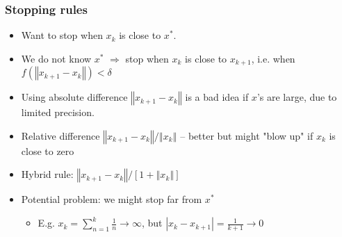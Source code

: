 \documentclass[bigger]{beamer}
\begin{document}
\begin{frame}%
\frametitle{Stopping rules}

\begin{itemize}
\item Want to stop when $x_{k}$ is close to $x^{\ast }$.

\item We do not know $x^{\ast }$ $\Rightarrow $ stop when $x_{k}$ is close
to $x_{k+1}$, \newline
i.e. when $f\left( \left\Vert x_{k+1}-x_{k}\right\Vert \right) <\delta $

\item Using absolute difference $\left\Vert x_{k+1}-x_{k}\right\Vert $ is a
bad idea \newline
if $x$'s are large, due to limited precision.

\item Relative difference $\left\Vert x_{k+1}-x_{k}\right\Vert /\left\Vert
x_{k}\right\Vert $ -- better but \newline
might "blow up" if $x_{k}$ is close to zero

\item Hybrid rule: $\left\Vert x_{k+1}-x_{k}\right\Vert /\left[ 1+\left\Vert
x_{k}\right\Vert \right] $

\item Potential problem: we might stop far from $x^{\ast }$

\begin{itemize}
\item E.g. $x_{k}=\sum\nolimits_{n=1}^{k}\frac{1}{n}\rightarrow \infty $,
but $\left\vert x_{k}-x_{k+1}\right\vert =\frac{1}{k+1}\rightarrow 0$
\end{itemize}
\end{itemize}


\end{frame}%
\end{document}
